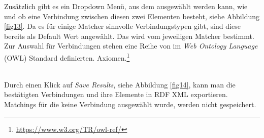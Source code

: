 		Zusätzlich gibt es ein Dropdown Menü, aus dem ausgewählt werden kann, wie und
		ob eine Verbindung zwischen diesen zwei Elementen besteht, siehe Abbildung \ref{fig13}. Da es für
		einige Matcher sinnvolle Verbindungstypen gibt, sind diese bereits als Default
		Wert angewählt. Das wird vom jeweiligen Matcher bestimmt. Zur Auswahl für
		Verbindungen stehen eine Reihe von im \textit{Web Ontology Language} (OWL)
		Standard definierten.
		Axiomen.\footnote{\url{https://www.w3.org/TR/owl-ref/}}\\
		\begin{minipage}{\linewidth}
			\label{fig13}  
		\end{minipage}
		\\
		Durch einen Klick auf \textit{Save Results}, siehe Abbildung \ref{fig14}, kann
		man die bestätigten Verbindungen und ihre Elemente in RDF XML exportieren. Matchings für die keine
		Verbindung ausgewählt wurde, werden nicht gespeichert.\\
		\begin{minipage}{\linewidth}
			\label{fig14}  
		\end{minipage}
